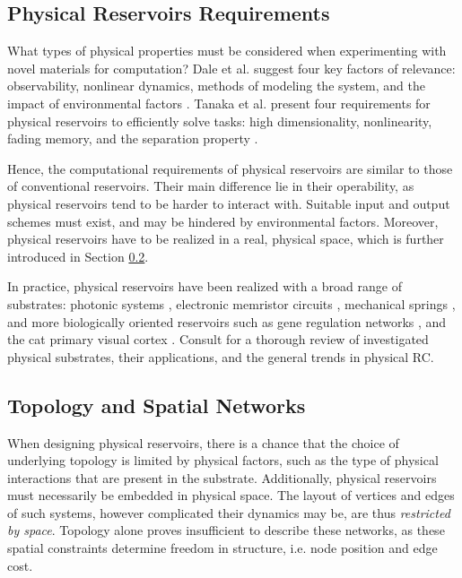 \subsection{Physical Reservoirs Requirements}

What types of physical properties must be considered when experimenting with
novel materials for computation? Dale et al. suggest four key factors of
relevance: observability, nonlinear dynamics, methods of modeling the system,
and the impact of environmental factors \cite{adamatzky_reservoir_2017}. Tanaka
et al. present four requirements for physical reservoirs to efficiently solve
tasks: high dimensionality, nonlinearity, fading memory, and the separation
property \cite{tanaka_recent_2018}.

Hence, the computational requirements of physical reservoirs are similar to
those of conventional reservoirs. Their main difference lie in their
operability, as physical reservoirs tend to be harder to interact with. Suitable
input and output schemes must exist, and may be hindered by environmental
factors. Moreover, physical reservoirs have to be realized in a real, physical
space, which is further introduced in Section
\ref{ssec:topology-and-spatial-networks}.

In practice, physical reservoirs have been realized with a broad range of
substrates: photonic systems \cite{vandoorne_experimental_2014}, electronic
memristor circuits \cite{kulkarni_memristor-based_2012}, mechanical springs
\cite{hauser_towards_2011}, and more biologically oriented reservoirs such as
gene regulation networks \cite{jones_is_2007}, and the cat primary visual cortex
\cite{scholkopf_temporal_2007}. Consult \cite{tanaka_recent_2018} for a thorough
review of investigated physical substrates, their applications, and the general
trends in physical RC.

\subsection{Topology and Spatial Networks}
\label{ssec:topology-and-spatial-networks}

When designing physical reservoirs, there is a chance that the choice of
underlying topology is limited by physical factors, such as the type of physical
interactions that are present in the substrate. Additionally, physical
reservoirs must necessarily be embedded in physical space. The layout of
vertices and edges of such systems, however complicated their dynamics may be,
are thus \textit{restricted by space}. Topology alone proves insufficient to
describe these networks, as these spatial constraints determine freedom in
structure, i.e. node position and edge cost.

